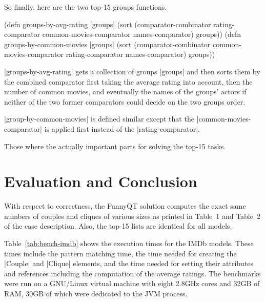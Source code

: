 \documentclass[submission]{eptcs}
\newcommand{\code}{\clojureinline}
\begin{document}
So finally, here are the two top-15 groups functions.

\begin{clojurecode}
(defn groups-by-avg-rating [groups]
  (sort (comparator-combinator rating-comparator common-movies-comparator names-comparator) groups))
(defn groups-by-common-movies [groups]
  (sort (comparator-combinator common-movies-comparator rating-comparator names-comparator) groups))
\end{clojurecode}

\code|groups-by-avg-rating| gets a collection of groups \code|groups| and then
sorts them by the combined comparator first taking the average rating into
account, then the number of common movies, and eventually the names of the
groups' actors if neither of the two former comparators could decide on the two
groups order.

\code|group-by-common-movies| is defined similar except that the
\code|common-movies-comparator| is applied first instead of the
\code|rating-comparator|.

Those where the actually important parts for solving the top-15 tasks.


\section{Evaluation and Conclusion}
\label{sec:evaluation}

With respect to correctness, the FunnyQT solution computes the exact same
numbers of couples and cliques of various sizes as printed in Table~1 and
Table~2 of the case description.  Also, the top-15 lists are identical for all
models.

Table~\ref{tab:bench-imdb} shows the execution times for the IMDb models.
These times include the pattern matching time, the time needed for creating the
\code|Couple| and \code|Clique| elements, and the time needed for setting their
attributes and references including the computation of the average ratings.
The benchmarks were run on a GNU/Linux virtual machine with eight 2.8GHz cores
and 32GB of RAM, 30GB of which were dedicated to the JVM process.
\end{document}

